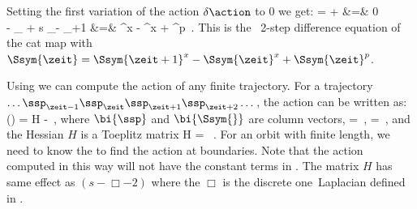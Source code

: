 Setting the first variation of the action $\delta \action$ to 0 we get:
\bea
\frac{\partial \action}{\partial \ssp_\zeit} =
 +  &=& 0 \\
\Rightarrow  - \ssp_{} + s \ssp_\zeit - \ssp_{\zeit+1}
&=& ^x - \Ssym{\zeit}^x + \Ssym{\zeit}^p
\,.
\label{ActVariantion}
\eea
This is the \PV\ 2-step difference equation of the cat map with $\Ssym{\zeit} = \Ssym{\zeit+1}^x - \Ssym{\zeit}^x + \Ssym{\zeit}^p$.

Using  we can compute the action of
any finite trajectory. For a trajectory $\dots \ssp_{\zeit-1}
\ssp_{\zeit} \ssp_{\zeit+1} \ssp_{\zeit+2} \dots$, the action can be
written as:
\beq
\action() =  \transp{\bi{\ssp}} H \bi{\ssp} - \transp{\bi{\Ssym{}}} \bi{\ssp}
\,,
where $\bi{\ssp}$ and $\bi{\Ssym{}}$ are column vectors,
\bea
\bi{\ssp}
=
\,,
\quad
\bi{\Ssym{}}
=
\,,
\label{eq:VectorFieldSourceNonPeriodic}
\eea
and the Hessian $H$ is a Toeplitz matrix
\bea
H
=
 \, .
\label{eq:HessianMatrixNonPeriodic}
\eea
For an orbit with finite length, we need to know the {\bcs}
to find the action at boundaries. Note that the action computed in this
way will not have the constant terms in . The
matrix $H$ has same effect as $(s-\Box -2)$ where the $\Box$ is the
discrete one\dmn\ Laplacian defined in .

